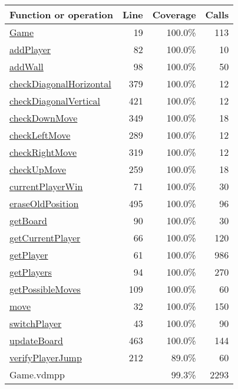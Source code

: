 \begin{longtable}{|l|r|r|r|}
\hline
Function or operation & Line & Coverage & Calls \\
\hline
\hline
\hyperref[Game:19]{Game} & 19&100.0\% & 113 \\
\hline
\hyperref[addPlayer:82]{addPlayer} & 82&100.0\% & 10 \\
\hline
\hyperref[addWall:98]{addWall} & 98&100.0\% & 50 \\
\hline
\hyperref[checkDiagonalHorizontal:379]{checkDiagonalHorizontal} & 379&100.0\% & 12 \\
\hline
\hyperref[checkDiagonalVertical:421]{checkDiagonalVertical} & 421&100.0\% & 12 \\
\hline
\hyperref[checkDownMove:349]{checkDownMove} & 349&100.0\% & 18 \\
\hline
\hyperref[checkLeftMove:289]{checkLeftMove} & 289&100.0\% & 12 \\
\hline
\hyperref[checkRightMove:319]{checkRightMove} & 319&100.0\% & 12 \\
\hline
\hyperref[checkUpMove:259]{checkUpMove} & 259&100.0\% & 18 \\
\hline
\hyperref[currentPlayerWin:71]{currentPlayerWin} & 71&100.0\% & 30 \\
\hline
\hyperref[eraseOldPosition:495]{eraseOldPosition} & 495&100.0\% & 96 \\
\hline
\hyperref[getBoard:90]{getBoard} & 90&100.0\% & 30 \\
\hline
\hyperref[getCurrentPlayer:66]{getCurrentPlayer} & 66&100.0\% & 120 \\
\hline
\hyperref[getPlayer:61]{getPlayer} & 61&100.0\% & 986 \\
\hline
\hyperref[getPlayers:94]{getPlayers} & 94&100.0\% & 270 \\
\hline
\hyperref[getPossibleMoves:109]{getPossibleMoves} & 109&100.0\% & 60 \\
\hline
\hyperref[move:32]{move} & 32&100.0\% & 150 \\
\hline
\hyperref[switchPlayer:43]{switchPlayer} & 43&100.0\% & 90 \\
\hline
\hyperref[updateBoard:463]{updateBoard} & 463&100.0\% & 144 \\
\hline
\hyperref[verifyPlayerJump:212]{verifyPlayerJump} & 212&89.0\% & 60 \\
\hline
\hline
Game.vdmpp & & 99.3\% & 2293 \\
\hline
\end{longtable}

